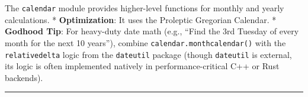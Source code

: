 The \passthrough{\lstinline!calendar!} module provides higher-level
functions for monthly and yearly calculations. * \textbf{Optimization}:
It uses the Proleptic Gregorian Calendar. * \textbf{Godhood Tip}: For
heavy-duty date math (e.g., ``Find the 3rd Tuesday of every month for
the next 10 years''), combine
\passthrough{\lstinline!calendar.monthcalendar()!} with the
\passthrough{\lstinline!relativedelta!} logic from the
\passthrough{\lstinline!dateutil!} package (though
\passthrough{\lstinline!dateutil!} is external, its logic is often
implemented natively in performance-critical C++ or Rust backends).

\begin{center}\rule{0.5\linewidth}{0.5pt}\end{center}

